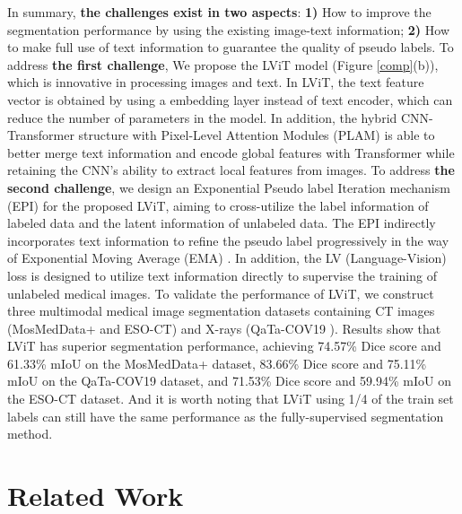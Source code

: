 \documentclass[lettersize,journal]{IEEEtran}
\begin{document}
In summary, \textbf{the challenges exist in two aspects}: \textbf{1)} How to improve the segmentation performance by using the existing image-text information; \textbf{2)} How to make full use of text information to guarantee the quality of pseudo labels. To address \textbf{the first challenge}, We propose the LViT model (Figure \ref{comp}(b)), which is innovative in processing images and text. In LViT, the text feature vector is obtained by using a embedding layer instead of text encoder, which can  reduce the number of parameters in the model. 
In addition, the hybrid CNN-Transformer structure with Pixel-Level Attention Modules (PLAM) is able to better merge text information and encode global features with Transformer while retaining the CNN's ability to extract local features from images.
To address \textbf{the second challenge}, we design an Exponential Pseudo label Iteration mechanism (EPI) for the proposed LViT, aiming to cross-utilize the label information of labeled data and the latent information of unlabeled data. The EPI indirectly incorporates text information to refine the pseudo label progressively in the way of Exponential Moving Average (EMA) \cite{7grill2020bootstrap}. In addition, the LV (Language-Vision) loss is designed to utilize text information directly to supervise the training of unlabeled medical images. To validate the performance of LViT, we construct three multimodal medical image segmentation datasets containing CT images (MosMedData+ \cite{morozov2020mosmeddata,hofmanninger2020automatic} and ESO-CT) and X-rays (QaTa-COV19 \cite{48degerli2022osegnet}). Results show that LViT has superior segmentation performance, achieving 74.57\% Dice score and 61.33\% mIoU on the MosMedData+ dataset, 83.66\% Dice score and 75.11\% mIoU on the QaTa-COV19 dataset, and 71.53\% Dice score and 59.94\% mIoU on the ESO-CT dataset. And it is worth noting that LViT using 1/4 of the train set labels can still have the same performance as the fully-supervised segmentation method.


\section{Related Work}
\label{gen_inst}
\end{document}
